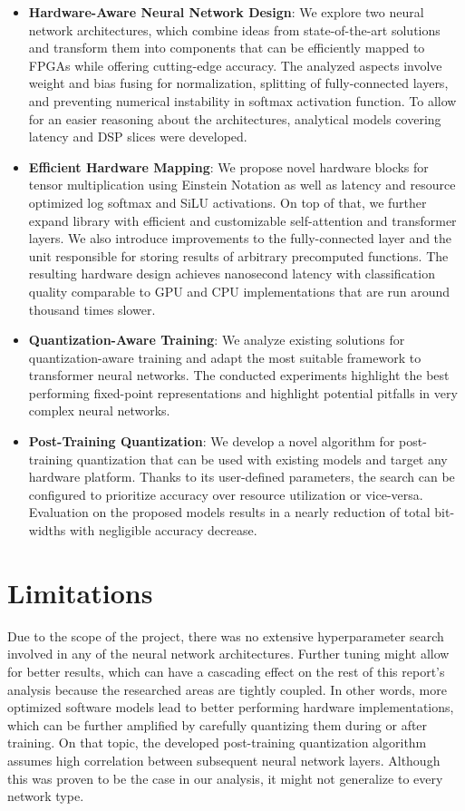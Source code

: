 \begin{itemize}
  \item \textbf{Hardware-Aware Neural Network Design}: We explore two neural network architectures, which combine ideas from state-of-the-art solutions and transform them into components that can be efficiently mapped to FPGAs while offering cutting-edge accuracy. The analyzed aspects involve weight and bias fusing for normalization, splitting of fully-connected layers, and preventing numerical instability in softmax activation function. To allow for an easier reasoning about the architectures, analytical models covering latency and DSP slices were developed.

  \item \textbf{Efficient Hardware Mapping}: We propose novel hardware blocks for tensor multiplication using Einstein Notation as well as latency and resource optimized log softmax and SiLU activations. On top of that, we further expand \hlsml library with efficient and customizable self-attention and transformer layers. We also introduce improvements to the fully-connected layer and the unit responsible for storing results of arbitrary precomputed functions. The resulting hardware design achieves nanosecond latency with classification quality comparable to GPU and CPU implementations that are run around thousand times slower.

  \item \textbf{Quantization-Aware Training}: We analyze existing solutions for quantization-aware training and adapt the most suitable framework to transformer neural networks. The conducted experiments highlight the best performing fixed-point representations and highlight potential pitfalls in very complex neural networks.

  \item \textbf{Post-Training Quantization}: We develop a novel algorithm for post-training quantization that can be used with existing models and target any hardware platform. Thanks to its user-defined parameters, the search can be configured to prioritize accuracy over resource utilization or vice-versa. Evaluation on the proposed models results in a nearly  reduction of total bit-widths with negligible accuracy decrease.
\end{itemize}

\section{Limitations}
Due to the scope of the project, there was no extensive hyperparameter search involved in any of the neural network architectures. Further tuning might allow for better results, which can have a cascading effect on the rest of this report's analysis because the researched areas are tightly coupled. In other words, more optimized software models lead to better performing hardware implementations, which can be further amplified by carefully quantizing them during or after training. On that topic, the developed post-training quantization algorithm assumes high correlation between subsequent neural network layers. Although this was proven to be the case in our analysis, it might not generalize to every network type.

